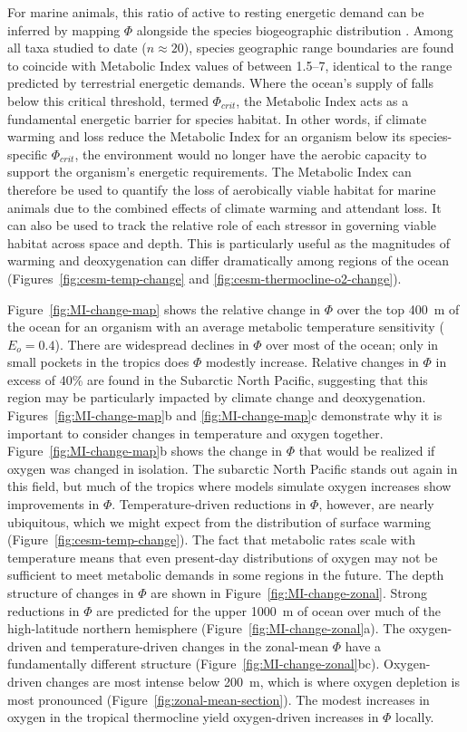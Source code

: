 \documentclass[draft,linenumbers]{report_chapter}
\begin{document}
For marine animals, this ratio of active to resting energetic demand can be inferred by mapping $\Phi$ alongside the species biogeographic distribution \citep{Deutsch-Ferrel-etal-2015}.
Among all taxa studied to date ($n\approx20$), species geographic range boundaries are found to coincide with Metabolic Index values of between 1.5--7, identical to the range predicted by terrestrial energetic demands.
Where the ocean's supply of  falls below this critical threshold, termed $\Phi_{crit}$, the Metabolic Index acts as a fundamental energetic barrier for species habitat.
In other words, if climate warming and  loss reduce the Metabolic Index for an organism below its species-specific $\Phi_{crit}$, the environment would no longer have the aerobic capacity to support the organism's energetic requirements.
The Metabolic Index can therefore be used to quantify the loss of aerobically viable habitat for marine animals due to the combined effects of climate warming and attendant  loss.
It can also be used to track the relative role of each stressor in governing viable habitat across space and depth.
This is particularly useful as the magnitudes of warming and deoxygenation can differ dramatically among regions of the ocean (Figures~\ref{fig:cesm-temp-change} and \ref{fig:cesm-thermocline-o2-change}).

Figure~\ref{fig:MI-change-map} shows the relative change in $\Phi$ over the top 400~m of the ocean for an organism with an average metabolic temperature sensitivity ($E_o = 0.4$).
There are widespread declines in $\Phi$ over most of the ocean; only in small pockets in the tropics does $\Phi$ modestly increase.
Relative changes in $\Phi$ in excess of 40\% are found in the Subarctic North Pacific, suggesting that this region may be particularly impacted by climate change and deoxygenation.
Figures~\ref{fig:MI-change-map}b and \ref{fig:MI-change-map}c demonstrate why it is important to consider changes in temperature and oxygen together.
Figure~\ref{fig:MI-change-map}b shows the change in $\Phi$ that would be realized if oxygen was changed in isolation.
The subarctic North Pacific stands out again in this field, but much of the tropics where models simulate oxygen increases show improvements in $\Phi$.
Temperature-driven reductions in $\Phi$, however, are nearly ubiquitous, which we might expect from the distribution of surface warming (Figure~\ref{fig:cesm-temp-change}).
The fact that metabolic rates scale with temperature means that even present-day distributions of oxygen may not be sufficient to meet metabolic demands in some regions in the future.
The depth structure of changes in $\Phi$ are shown in Figure~\ref{fig:MI-change-zonal}.
Strong reductions in $\Phi$ are predicted for the upper 1000~m of ocean over much of the high-latitude northern hemisphere (Figure~\ref{fig:MI-change-zonal}a).
The oxygen-driven and temperature-driven changes in the zonal-mean $\Phi$ have a fundamentally different structure (Figure~\ref{fig:MI-change-zonal}bc).
Oxygen-driven changes are most intense below 200~m, which is where oxygen depletion is most pronounced (Figure~\ref{fig:zonal-mean-section}).
The modest increases in oxygen in the tropical thermocline yield oxygen-driven increases in $\Phi$ locally.
\end{document}
